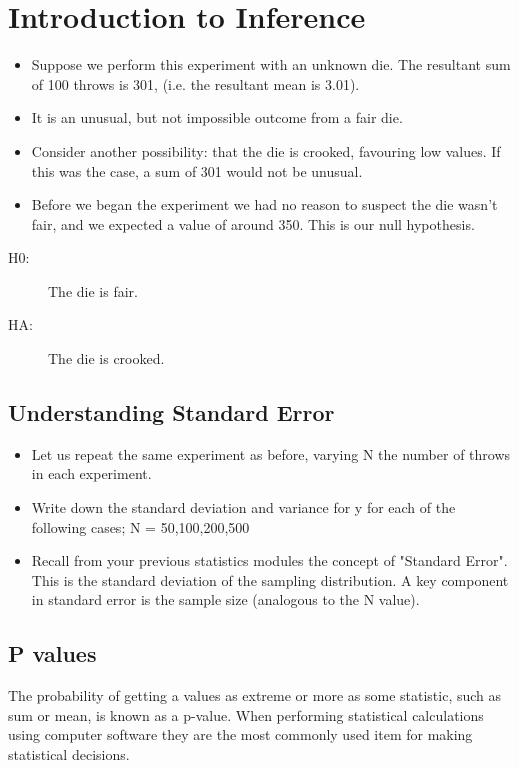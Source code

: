 \section{Introduction to Inference}
\begin{itemize}
\item Suppose we perform this experiment with an unknown die. The resultant sum of 100 throws is 301, (i.e. the resultant mean is 3.01). 
\item It is an unusual, but not impossible outcome from a fair die.
\item Consider another possibility: that the die is crooked, favouring low values. If this was the case, a sum of 301 would not be unusual.
\item 
Before we began the experiment we had no reason to suspect the die wasn't fair, and we expected a value of around 350. This is our null hypothesis.
\end{itemize}
\begin{description}
\item[H0:] The die is fair.
\item[HA:] The die is crooked.
\end{description}
\subsection*{Understanding Standard Error}
\begin{itemize}
\item Let us repeat the same experiment as before, varying N the number of throws in each experiment.
\item Write down the standard deviation and variance for y for each of the following cases; N = 50,100,200,500
\item Recall from your previous statistics modules the concept of "Standard Error". This is the standard deviation of the sampling distribution. A key component in standard error is the sample size (analogous to the N value).
\end{itemize}
\subsection*{P values}

The probability of getting a values as extreme or more as some statistic, such as sum or mean, is known as a p-value. When performing statistical calculations using computer software they are the most commonly used item for making statistical decisions.




